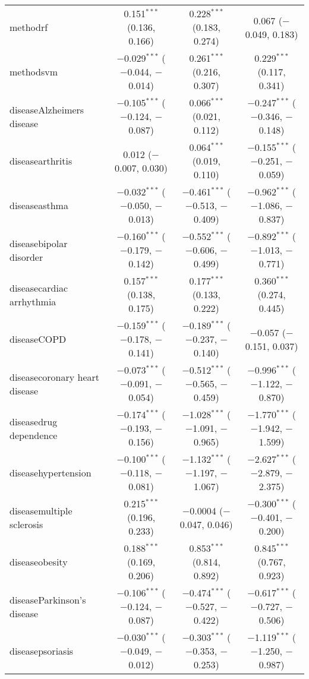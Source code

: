 \begin{table}[!htbp]
\begin{tabular}{@{\extracolsep{5pt}}lccc}
  methodrf & 0.151$^{***}$ (0.136, 0.166) & 0.228$^{***}$ (0.183, 0.274) & 0.067 ($-$0.049, 0.183) \\ 
  methodsvm & $-$0.029$^{***}$ ($-$0.044, $-$0.014) & 0.261$^{***}$ (0.216, 0.307) & 0.229$^{***}$ (0.117, 0.341) \\ 
  diseaseAlzheimers disease & $-$0.105$^{***}$ ($-$0.124, $-$0.087) & 0.066$^{***}$ (0.021, 0.112) & $-$0.247$^{***}$ ($-$0.346, $-$0.148) \\ 
  diseasearthritis & 0.012 ($-$0.007, 0.030) & 0.064$^{***}$ (0.019, 0.110) & $-$0.155$^{***}$ ($-$0.251, $-$0.059) \\ 
  diseaseasthma & $-$0.032$^{***}$ ($-$0.050, $-$0.013) & $-$0.461$^{***}$ ($-$0.513, $-$0.409) & $-$0.962$^{***}$ ($-$1.086, $-$0.837) \\ 
  diseasebipolar disorder & $-$0.160$^{***}$ ($-$0.179, $-$0.142) & $-$0.552$^{***}$ ($-$0.606, $-$0.499) & $-$0.892$^{***}$ ($-$1.013, $-$0.771) \\ 
  diseasecardiac arrhythmia & 0.157$^{***}$ (0.138, 0.175) & 0.177$^{***}$ (0.133, 0.222) & 0.360$^{***}$ (0.274, 0.445) \\ 
  diseaseCOPD & $-$0.159$^{***}$ ($-$0.178, $-$0.141) & $-$0.189$^{***}$ ($-$0.237, $-$0.140) & $-$0.057 ($-$0.151, 0.037) \\ 
  diseasecoronary heart disease & $-$0.073$^{***}$ ($-$0.091, $-$0.054) & $-$0.512$^{***}$ ($-$0.565, $-$0.459) & $-$0.996$^{***}$ ($-$1.122, $-$0.870) \\ 
  diseasedrug dependence & $-$0.174$^{***}$ ($-$0.193, $-$0.156) & $-$1.028$^{***}$ ($-$1.091, $-$0.965) & $-$1.770$^{***}$ ($-$1.942, $-$1.599) \\ 
  diseasehypertension & $-$0.100$^{***}$ ($-$0.118, $-$0.081) & $-$1.132$^{***}$ ($-$1.197, $-$1.067) & $-$2.627$^{***}$ ($-$2.879, $-$2.375) \\ 
  diseasemultiple sclerosis & 0.215$^{***}$ (0.196, 0.233) & $-$0.0004 ($-$0.047, 0.046) & $-$0.300$^{***}$ ($-$0.401, $-$0.200) \\ 
  diseaseobesity & 0.188$^{***}$ (0.169, 0.206) & 0.853$^{***}$ (0.814, 0.892) & 0.845$^{***}$ (0.767, 0.923) \\ 
  diseaseParkinson's disease & $-$0.106$^{***}$ ($-$0.124, $-$0.087) & $-$0.474$^{***}$ ($-$0.527, $-$0.422) & $-$0.617$^{***}$ ($-$0.727, $-$0.506) \\ 
  diseasepsoriasis & $-$0.030$^{***}$ ($-$0.049, $-$0.012) & $-$0.303$^{***}$ ($-$0.353, $-$0.253) & $-$1.119$^{***}$ ($-$1.250, $-$0.987) \\ 

\end{tabular}
\end{table}

